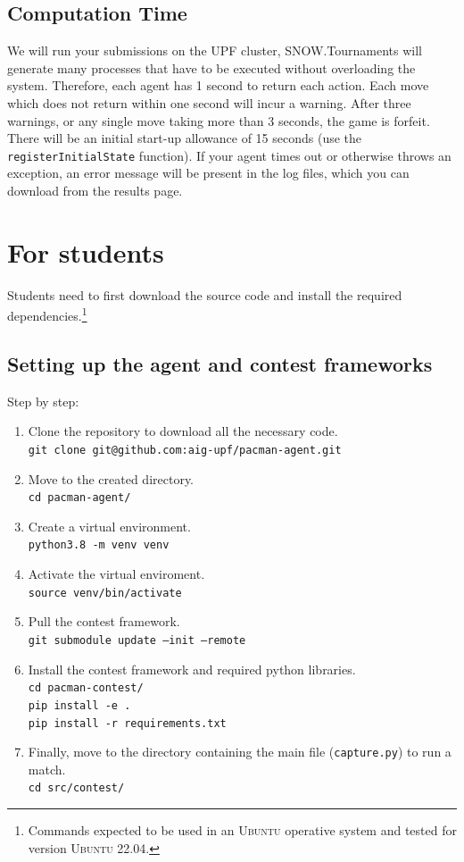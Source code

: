 \documentclass[11pt]{article}
\begin{document}
\subsection{Computation Time}
We will run your submissions on the UPF cluster, SNOW.Tournaments will generate many processes that have to be executed without overloading the system. Therefore,  each agent has 1 second to return each action. Each move which does not return within one second will incur a warning. After three warnings, or any single move taking more than 3 seconds, the game is forfeit. There will be an initial start-up allowance of 15 seconds (use the \texttt{registerInitialState} function). If your agent times out or otherwise throws an exception, an error message will be present in the log files, which you can download from the results page.


\section{For students}
\label{sec:students}

Students need to first download the source code and install the required dependencies.\footnote{Commands expected to be used in an \textsc{Ubuntu} operative system and tested for version \textsc{Ubuntu 22.04}.}

\subsection{Setting up the agent and contest frameworks}

Step by step:
\begin{enumerate}
    \item Clone the repository to download all the necessary code.\\
    \texttt{git clone git@github.com:aig-upf/pacman-agent.git}
    \item Move to the created directory.\\
    \texttt{cd pacman-agent/}
    \item Create a virtual environment.\\
    \texttt{python3.8 -m venv venv}
    \item Activate the virtual enviroment.\\
    \texttt{source venv/bin/activate}
    \item Pull the contest framework.\\
    \texttt{git submodule update --init --remote}
    \item Install the contest framework and required python libraries.\\
    \texttt{cd pacman-contest/}\\
    \texttt{pip install -e .} \\
    \texttt{pip install -r requirements.txt} 
    \item Finally, move to the directory containing the main file (\texttt{capture.py}) to run a match.\\
    \texttt{cd src/contest/}
\end{enumerate}
\end{document}

